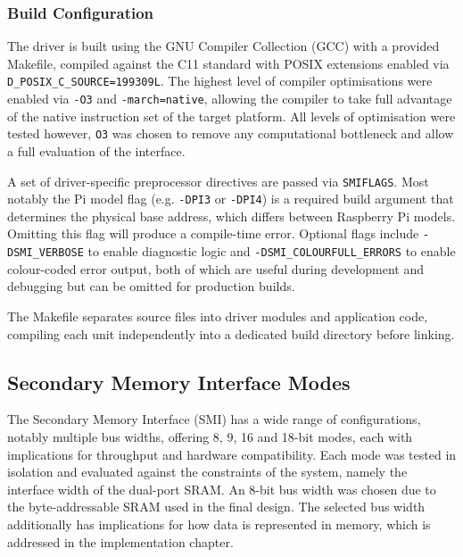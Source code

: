 \documentclass[final]{cmpreport}
\begin{document}
\subsubsection{Build Configuration}
The driver is built using the GNU Compiler Collection (GCC) with a provided Makefile, compiled against the C11 standard with POSIX extensions enabled via \texttt{D\_POSIX\-\_C\_SOURCE=199309L}. The highest level of compiler optimisations were enabled via \texttt{-O3} and \texttt{-march=native}, allowing the compiler to take full advantage of the native instruction set of the target platform. All levels of optimisation were tested however, \texttt{O3} was chosen to remove any computational bottleneck and allow a full evaluation of the interface.

A set of driver-specific preprocessor directives are passed via \texttt{SMIFLAGS}. Most notably the Pi model flag (e.g. \texttt{-DPI3} or \texttt{-DPI4}) is a required build argument that determines the physical base address, which differs between Raspberry Pi models. Omitting this flag will produce a compile-time error. Optional flags include \texttt{-DSMI\_VERBOSE} to enable diagnostic logic and \texttt{-DSMI\_COLOURFULL\_ERRORS} to enable colour-coded error output, both of which are useful during development and debugging but can be omitted for production builds.

The Makefile separates source files into driver modules and application code, compiling each unit independently into a dedicated build directory before linking.

\subsection{Secondary Memory Interface Modes}
The Secondary Memory Interface (SMI) has a wide range of configurations, notably multiple bus widths, offering 8, 9, 16 and 18-bit modes, each with implications for throughput and hardware compatibility. Each mode was tested in isolation and evaluated against the constraints of the system, namely the interface width of the dual-port SRAM\@. An 8-bit bus width was chosen due to the byte-addressable SRAM used in the final design. The selected bus width additionally has implications for how data is represented in memory, which is addressed in the implementation chapter.
\end{document}
